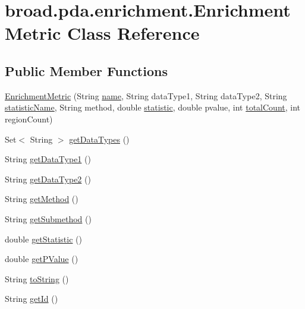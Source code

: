 \hypertarget{classbroad_1_1pda_1_1enrichment_1_1_enrichment_metric}{\section{broad.\+pda.\+enrichment.\+Enrichment\+Metric Class Reference}
\label{classbroad_1_1pda_1_1enrichment_1_1_enrichment_metric}
}
\subsection*{Public Member Functions}
\begin{DoxyCompactItemize}
\item 
\hyperlink{classbroad_1_1pda_1_1enrichment_1_1_enrichment_metric_a4dbffcb03b6e3bde170532015de88671}{Enrichment\+Metric} (String \hyperlink{classbroad_1_1pda_1_1enrichment_1_1_enrichment_metric_ab1ffd9c09dfc9d431c2dd205110811c2}{name}, String data\+Type1, String data\+Type2, String \hyperlink{classbroad_1_1pda_1_1enrichment_1_1_enrichment_metric_a942a9a1a78e214597d2e96b0ff214771}{statistic\+Name}, String method, double \hyperlink{classbroad_1_1pda_1_1enrichment_1_1_enrichment_metric_a9300edd46bda63f9b0b15267c6a840bf}{statistic}, double pvalue, int \hyperlink{classbroad_1_1pda_1_1enrichment_1_1_enrichment_metric_a515f9f05d5b7b46acaefeb8433f9fe4c}{total\+Count}, int region\+Count)
\item 
Set$<$ String $>$ \hyperlink{classbroad_1_1pda_1_1enrichment_1_1_enrichment_metric_ad6b6fa73f1d0d0da595ff99c4411bcea}{get\+Data\+Types} ()
\item 
String \hyperlink{classbroad_1_1pda_1_1enrichment_1_1_enrichment_metric_a1e902f9e0b8a955dd86fee8792754cf7}{get\+Data\+Type1} ()
\item 
String \hyperlink{classbroad_1_1pda_1_1enrichment_1_1_enrichment_metric_a8974577185db4df2da04ae324677fd5a}{get\+Data\+Type2} ()
\item 
String \hyperlink{classbroad_1_1pda_1_1enrichment_1_1_enrichment_metric_a256b5d9c11e0f925f9f4894b9a68ec39}{get\+Method} ()
\item 
String \hyperlink{classbroad_1_1pda_1_1enrichment_1_1_enrichment_metric_a09fba0011238304a664db239acf77c95}{get\+Submethod} ()
\item 
double \hyperlink{classbroad_1_1pda_1_1enrichment_1_1_enrichment_metric_a586064a2f01aadc6436173ac6ae8cb4f}{get\+Statistic} ()
\item 
double \hyperlink{classbroad_1_1pda_1_1enrichment_1_1_enrichment_metric_ad8d4cf2c011985b7211e5ffc31062266}{get\+P\+Value} ()
\item 
String \hyperlink{classbroad_1_1pda_1_1enrichment_1_1_enrichment_metric_ac10aafdc94e2ef0c6b74ca417dd6c853}{to\+String} ()
\item 
String \hyperlink{classbroad_1_1pda_1_1enrichment_1_1_enrichment_metric_aee144337542c922c3f9574ba37eebc1a}{get\+Id} ()
\end{DoxyCompactItemize}
